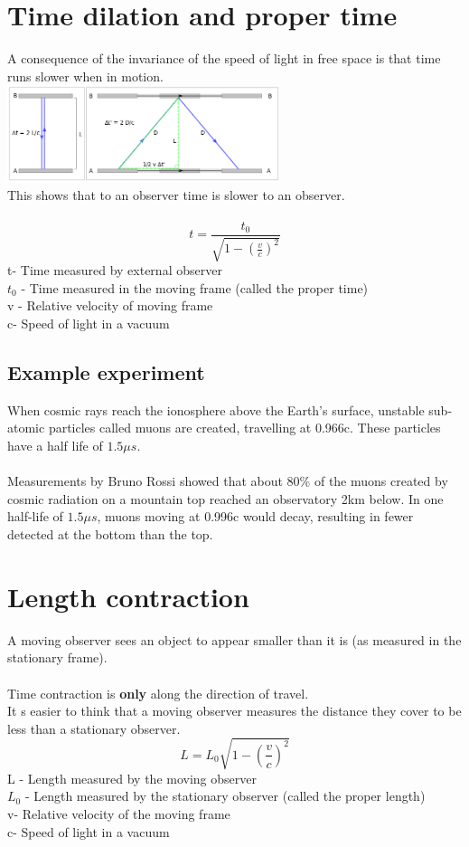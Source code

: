 \documentclass[12pt]{article}
\begin{document}
\section{Time dilation and proper time}
A consequence of the invariance of the speed of light in free space is that time runs slower when in motion. \\
\includegraphics[width=8cm]{time_dilation.png}\\
This shows that to an observer time is slower to an observer.\\
\\
$$t=\frac{t_0}{\sqrt{1-(\frac{v}{c})^2}}$$
t- Time measured by external observer\\
$t_0$ - Time measured in the moving frame (called the proper time)\\
v - Relative velocity of moving frame\\
c- Speed of light in a vacuum
\subsection{Example experiment}
When cosmic rays reach the ionosphere above the Earth's surface, unstable sub-atomic particles called muons are created, travelling at 0.966c. These particles have a half life of $1.5\mu s$.\\
\\
Measurements by Bruno Rossi showed that about 80\% of the muons created by cosmic radiation on a mountain top reached an observatory 2km below. In one half-life of $1.5\mu s$, muons moving at 0.996c would decay, resulting in fewer detected at the bottom than the top.
\section{Length contraction}
A moving observer sees an object to appear smaller than it is (as measured in the stationary frame).\\
\\
Time contraction is \textbf{only} along the direction of travel.\\
It s easier to think that a moving observer measures the distance they cover to be less than a stationary observer.
$$L=L_0\sqrt{1-(\frac{v}{c})^2}$$
L - Length measured by the moving observer\\
$L_0$ - Length measured by the stationary observer (called the proper length)\\
v- Relative velocity of the moving frame\\
c- Speed of light in a vacuum
\end{document}
